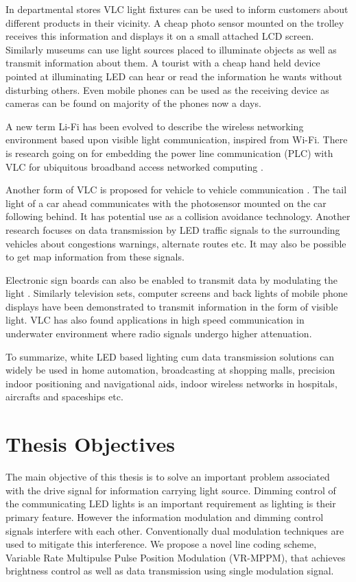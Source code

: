 In departmental stores VLC light fixtures can be used to inform customers about different products in their vicinity. A cheap photo sensor mounted on the trolley receives this information and displays it on a small attached LCD screen. Similarly museums can use light sources placed to illuminate objects as well as transmit information about them. A tourist with a cheap hand held device pointed at illuminating LED can hear or read the information he wants without disturbing others. Even mobile phones can be used as the receiving device as cameras can be found on majority of the phones now a days.

A new term Li-Fi has been evolved to describe the wireless networking environment based upon visible light communication, inspired from Wi-Fi. There is research going on for embedding the power line communication (PLC) with VLC for ubiquitous broadband access networked computing \cite{komine2003integrated}.

Another form of VLC is proposed for vehicle to vehicle communication \cite{dunning2004inter}. The tail light of a car ahead communicates with the photosensor mounted on the car following behind. It has potential use as a collision avoidance technology. Another research focuses on data transmission by LED traffic signals to the surrounding vehicles \cite{arai2007experimental} about congestions warnings, alternate routes etc. It may also be possible to get map information from these signals.

Electronic sign boards can also be enabled to transmit data by modulating the light \cite{park2007information}. Similarly television sets, computer screens and back lights of mobile phone displays have been demonstrated to transmit information in the form of visible light. VLC has also found applications in high speed communication in underwater environment where radio signals undergo higher attenuation.

To summarize, white LED based lighting cum data transmission solutions can widely be used in home automation, broadcasting at shopping malls, precision indoor positioning and navigational aids, indoor wireless networks in hospitals, aircrafts and spaceships etc.

\section{Thesis Objectives}
The main objective of this thesis is to solve an important problem associated with the drive signal for information carrying light source. Dimming control of the communicating LED lights is an important requirement as lighting is their primary feature. However the information modulation and dimming control signals interfere with each other. Conventionally dual modulation techniques are used to mitigate this interference. We propose a novel line coding scheme, Variable Rate Multipulse Pulse Position Modulation (VR-MPPM), that achieves brightness control as well as data transmission using single modulation signal.

